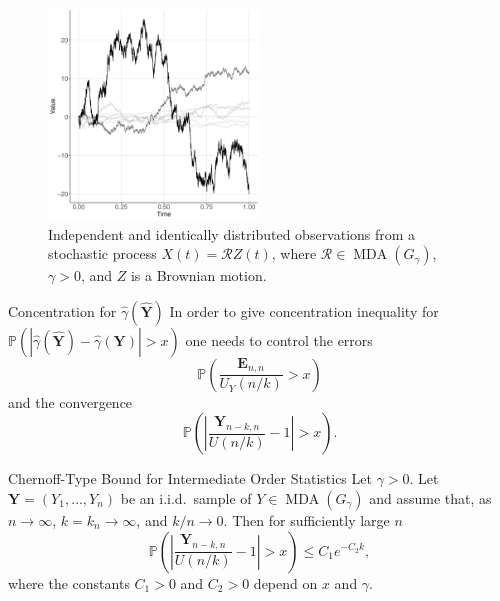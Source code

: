 \documentclass[11pt, aspectratio=169]{beamer}
\DeclareMathOperator{\mda}{MDA}
\begin{document}

\begin{frame}
  \begin{figure}
    \centering
    \includegraphics[width = 0.5\textwidth]{functional}
    \caption{Independent and identically distributed observations from a
    stochastic process $X(t) = \mathcal{R}Z(t)$, where
    $\mathcal{R}\in\mda\left(G_\gamma\right)$, $\gamma > 0$, and $Z$ is a
    Brownian motion.}
  \end{figure}
\end{frame}


\begin{frame}{Concentration for $\hat\gamma(\hat{\bm Y})$} In order to give
  concentration inequality for $\mathbb{P}\left(\left|\hat\gamma(\hat{\bm Y}) -
  \hat\gamma(\bm Y)\right| > x\right)$ one needs to control the errors
  \begin{equation*}
    \mathbb{P}\left(\frac{\bm E_{n,n}}{U_Y\left(n/k\right)} > x\right)
  \end{equation*}
  and the convergence
  \begin{equation*}
    \mathbb{P}\left(\left|\frac{\bm
    Y_{n-k,n}}{U(n/k)} - 1\right| > x\right).
  \end{equation*}
\end{frame}


\begin{frame}{Chernoff-Type Bound for Intermediate Order Statistics}
  Let $\gamma > 0$. Let $\bm Y = \left(Y_1, \ldots, Y_n\right)$ be an i.i.d.\
  sample of $Y\in\mda\left(G_\gamma\right)$ and assume that, as $n\to\infty$,
  $k=k_n\to\infty$, and $k/n\to 0$. Then for sufficiently large $n$
  \begin{equation*}
    \mathbb{P}\left(\left|\frac{\bm
    Y_{n-k,n}}{U(n/k)} - 1\right| > x\right)
    \leq C_1 e^{-C_2 k},
  \end{equation*} 
  where the constants $C_1 > 0$ and $C_2 > 0$ depend on $x$ and $\gamma$.
\end{frame}
\end{document}
